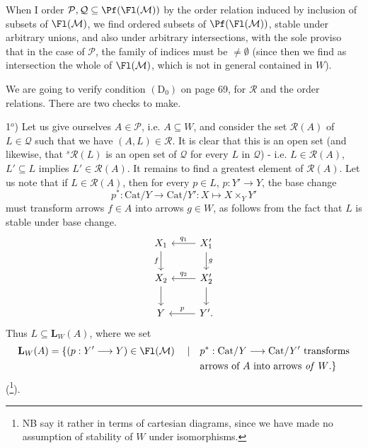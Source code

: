 When I order $\mathcal{P},\mathcal{Q}\subseteq\Pf(\Fl(\mathcal{M}))$ by the order relation induced by inclusion of subsets of $\Fl(\mathcal{M})$, we find ordered subsets of $\Pf(\Fl(\mathcal{M}))$, stable under arbitrary unions, and also under arbitrary intersections, with the sole proviso that in the case of $\mathcal{P}$, the family of indices must be $\neq\emptyset$ (since then we find as intersection the whole of $\Fl(\mathcal{M})$, which is not in general contained in $W$). %

We are going to verify condition $(\mathrm{D}_0)$ on page 69, for $\mathcal{R}$ and the order relations. There are two checks to make.

1$^{o}$) Let us give ourselves $A\in\mathcal{P}$, i.e. $A\subseteq W$, and consider the set $\mathcal{R}(A)$ of $L\in\mathcal{Q}$ such that we have $(A,L)\in\mathcal{R}$. It is clear that this is an open set (and likewise, that ${}^{s}\mathcal{R}(L)$ is an open set of $\mathcal{Q}$ for every $L$ in $\mathcal{Q}$) - i.e. $L\in\mathcal{R}(A)$, $L'\subseteq L$ implies %
$L'\in\mathcal{R}(A)$. It remains to find a greatest element of $\mathcal{R}(A)$. Let us note that if $L\in\mathcal{R}(A)$, then for every $p\in L$, $p : Y'\longrightarrow Y$, the base change
\[
p^{*} : \mathrm{Cat}/Y\longrightarrow\mathrm{Cat}/Y' : X\longmapsto X\times_{Y}Y'
\]
must transform arrows $f\in A$ into arrows $g\in W$, as follows from the fact that $L$ is stable under base change.
\[
\begin{tikzcd}
X_1 \arrow[d, "f"'] & X'_1 \arrow[l, "q_1"'] \arrow[d, "g"] \\
X_2 \arrow[d] & X'_2 \arrow[l, "q_2"'] \arrow[d] \\
Y & Y'. \arrow[l, "p"']
\end{tikzcd}
\]
Thus $L\subseteq\mathbf{L}_W(A)$, where we set
\[
\begin{aligned}
\mathbf{L}_W(A)=\{(p : Y'\longrightarrow Y)\in\Fl(\mathcal{M})\quad\mid\quad & p^{*} : \mathrm{Cat}/Y\longrightarrow\mathrm{Cat}/Y'\ \text{transforms}\\
& \text{arrows of $A$ into arrows \textit{of} $W$.}\}
\end{aligned}
\]
(\footnote{NB say it rather in terms of cartesian diagrams, since we have made no assumption of stability of $W$ under isomorphisms.}).
